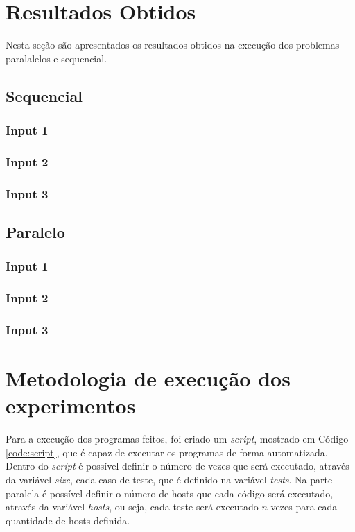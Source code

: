 \documentclass[11pt,twoside]{article}
\begin{document}
{{\section{Resultados Obtidos}

	Nesta seção são apresentados os resultados obtidos na execução dos problemas paralalelos e sequencial.

    \subsection{Sequencial}
        \subsubsection{Input 1}
    	\subsubsection{Input 2}
    	\subsubsection{Input 3}
    \subsection{Paralelo}
    	\subsubsection{Input 1}
    	\subsubsection{Input 2}
		\subsubsection{Input 3}
		
\section{Metodologia de execução dos experimentos}

    Para a execução dos programas feitos, foi criado um \textit{script}, mostrado em Código
    \ref{code:script}, que é capaz de executar os programas de forma automatizada.
    Dentro do {\it script} é possível definir o número de vezes que será executado, através da
    variável {\it size}, cada caso de teste, que é definido na variável {\it tests}. Na parte
    paralela é possível definir o número de hosts que cada código será executado, através da
    variável {\it hosts}, ou seja, cada teste será executado $n$ vezes para cada quantidade
    de hosts definida.

}}
\end{document}
